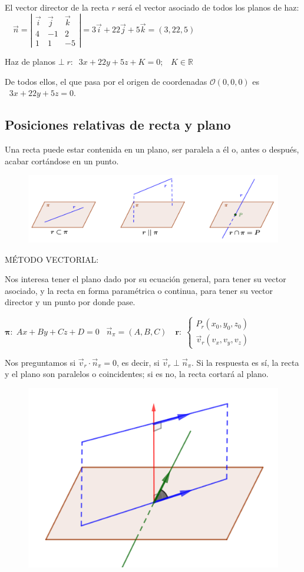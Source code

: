 \noindent El vector director de la recta $r$ será el vector asociado de todos los planos de haz: $\quad \vec n= \left| \begin{matrix} \vec i& \vec j & \vec k \\ 4&-1&2 \\ 1&1&-5 \end{matrix} \right| = 3\vec i + 22\vec j + 5 \vec k =(3,22,5)$

\noindent Haz de planos $\bot\; r: \;\; 3x+22y+5z+K=0; \;\; \;K \in \mathbb R$

\noindent De todos ellos, el que pasa por el origen de coordenadas $\mathcal O(0,0,0)$ es $\;\; 3x+22y+5z=0$.

\subsection{Posiciones relativas de recta y plano}

Una recta puede estar contenida en un plano, ser paralela a él o, antes o después, acabar cortándose en un punto.

	\begin{figure}[H]
		\centering
		\includegraphics[width=1\textwidth]{imagenes/imagenes10/T10IM15.png}
 	\end{figure}

MÉTODO VECTORIAL:

Nos interesa tener el plano dado por su ecuación general, para tener su vector asociado, y la recta en forma paramétrica o continua, para tener su vector director y un punto por donde pase.

$\boldsymbol{\pi:} \; Ax+By+Cz+D=0\;\; \; \vec n_{\pi}=(A,B,C) \quad \boldsymbol{r:}\; \begin{cases} P_r(x_0,y_0,z_0)\\ \vec v_r(v_x,v_y,v_z) \end{cases}$

\begin{multicols}{2}
Nos preguntamos si $\vec v_r \cdot \vec n_{\pi}=0$, es decir, si $\vec v_r \; \bot \; \vec n_{\pi}$. Si la respuesta es sí, la recta y el plano son paralelos o coincidentes; si es no, la recta cortará al plano.

	\begin{figure}[H]
		\centering
		\includegraphics[width=.4\textwidth]{imagenes/imagenes10/T10IM16.png}
 	\end{figure}
\end{multicols}


